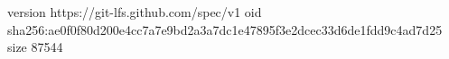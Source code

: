 version https://git-lfs.github.com/spec/v1
oid sha256:ae0f0f80d200e4cc7a7e9bd2a3a7dc1e47895f3e2dcec33d6de1fdd9c4ad7d25
size 87544
